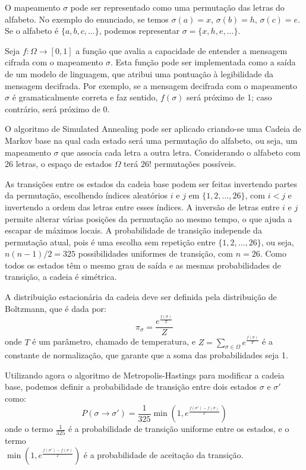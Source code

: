 \begin{resposta}
    O mapeamento $\sigma$ pode ser representado como uma permutação das letras do alfabeto. No exemplo do enunciado, se temos $\sigma(a) = x$, $\sigma(b) = h$, $\sigma(c) = e$. Se o alfabeto é $\{a, b, c, \ldots\}$, podemos representar $\sigma=\{x, h, e, \ldots\}$.

    Seja $f : \Omega \rightarrow [0,1]$ a função que avalia a capacidade de entender a mensagem cifrada com o mapeamento $\sigma$. Esta função pode ser implementada como a saída de um modelo de linguagem, que atribui uma pontuação à legibilidade da mensagem decifrada. Por exemplo, se a mensagem decifrada com o mapeamento $\sigma$ é gramaticalmente correta e faz sentido, $f(\sigma)$ será próximo de 1; caso contrário, será próximo de 0.

    O algoritmo de Simulated Annealing pode ser aplicado criando-se uma Cadeia de Markov base na qual cada estado será uma permutação do alfabeto, ou seja, um mapeamento $\sigma$ que associa cada letra a outra letra. Considerando o alfabeto com 26 letras, o espaço de estados $\Omega$ terá $26!$ permutações possíveis.

    As transições entre os estados da cadeia base podem ser feitas invertendo partes da permutação, escolhendo índices aleatórios $i$ e $j$ em $\{1, 2, \ldots, 26\}$, com $i<j$ e invertendo a ordem das letras entre esses índices. A inversão de letras entre $i$ e $j$ permite alterar várias posições da permutação ao mesmo tempo, o que ajuda a escapar de máximos locais. A probabilidade de transição independe da permutação atual, pois é uma escolha sem repetição entre $\{1, 2, \ldots, 26\}$, ou seja, $n(n-1)/2=325$ possibilidades uniformes de transição, com $n=26$. Como todos os estados têm o mesmo grau de saída e as mesmas probabilidades de transição, a cadeia é simétrica.

    A distribuição estacionária da cadeia deve ser definida pela distribuição de Boltzmann, que é dada por:
    $$ \pi_\sigma = \frac{e^{\frac{f(\sigma)}{T}}}{Z} $$
    onde $T$ é um parâmetro, chamado de temperatura, e $Z=\sum_{\sigma \in \Omega} e^{\frac{f(\sigma)}{T}}$ é a constante de normalização, que garante que a soma das probabilidades seja 1.

    Utilizando agora o algoritmo de Metropolis-Hastings para modificar a cadeia base, podemos definir a probabilidade de transição entre dois estados $\sigma$ e $\sigma'$ como:
    $$ P(\sigma \rightarrow \sigma') = \frac{1}{325}\min\left(1, e^{\frac{f(\sigma')-f(\sigma)}{T}}\right) $$
    onde o termo $\frac{1}{325}$ é a probabilidade de transição uniforme entre os estados, e o termo \\ $\min\left(1, e^{\frac{f(\sigma')-f(\sigma)}{T}}\right)$ é a probabilidade de aceitação da transição.


\end{resposta}
